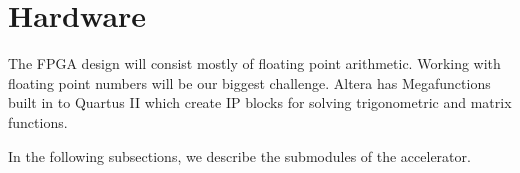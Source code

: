 \section{Hardware}

The FPGA design will consist mostly of floating point arithmetic. Working 
with floating point numbers will be our biggest challenge. Altera has 
Megafunctions built in to Quartus II which create IP blocks for solving trigonometric and matrix functions.

In the following subsections, we describe the submodules of the accelerator.





